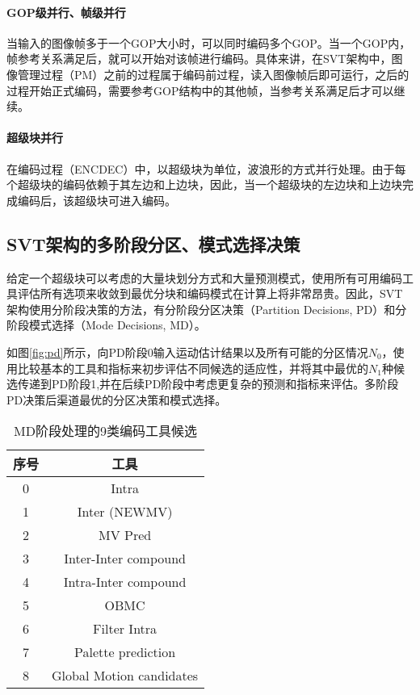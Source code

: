  \paragraph{GOP级并行、帧级并行} 当输入的图像帧多于一个GOP大小时，可以同时编码多个GOP。当一个GOP内，帧参考关系满足后，就可以开始对该帧进行编码。具体来讲，在SVT架构中，图像管理过程（PM）之前的过程属于编码前过程，读入图像帧后即可运行，之后的过程开始正式编码，需要参考GOP结构中的其他帧，当参考关系满足后才可以继续。
  \paragraph{超级块并行} 在编码过程（ENCDEC）中，以超级块为单位，波浪形的方式并行处理。由于每个超级块的编码依赖于其左边和上边块，因此，当一个超级块的左边块和上边块完成编码后，该超级块可进入编码。

  \subsection{SVT架构的多阶段分区、模式选择决策\cite{EncoderDesignSVTAV1}} \label{sec:pd-md}
  给定一个超级块可以考虑的大量块划分方式和大量预测模式，使用所有可用编码工具评估所有选项来收敛到最优分块和编码模式在计算上将非常昂贵。因此，SVT架构使用分阶段决策的方法，有分阶段分区决策（Partition Decisions, PD）和分阶段模式选择（Mode Decisions, MD）。

  如图\ref{fig:pd}所示，向PD阶段0输入运动估计结果以及所有可能的分区情况$N_0$，使用比较基本的工具和指标来初步评估不同候选的适应性，并将其中最优的$N_1$种候选传递到PD阶段1,并在后续PD阶段中考虑更复杂的预测和指标来评估。多阶段PD决策后渠道最优的分区决策和模式选择。

  \begin{table}[!hpt]
    \renewcommand{\arraystretch}{0.8}
    \caption{MD阶段处理的9类编码工具候选}
    \label{tab:av1-classes}
    \centering
    \begin{tabular}{cc} \toprule
      序号    & 工具 \\ \midrule
      0& Intra \\
      1& Inter (NEWMV) \\
      2& MV Pred  \\
      3& Inter-Inter compound \\
      4& Intra-Inter compound \\
      5& OBMC \\
      6& Filter Intra \\
      7& Palette prediction \\
      8& Global Motion candidates \\\bottomrule
    \end{tabular}
  \end{table}

